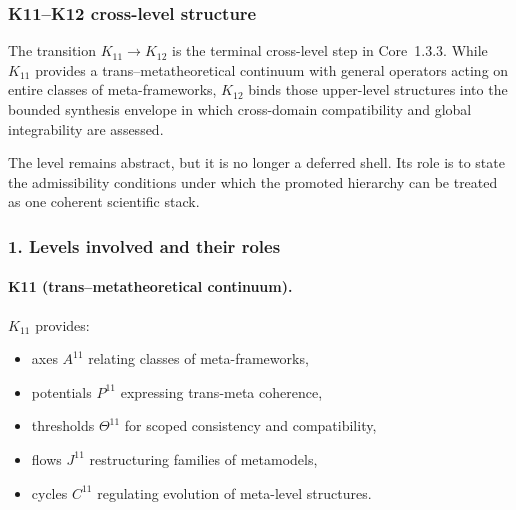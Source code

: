 
\subsubsection{K11–K12 cross-level structure}
\label{sec:crossk-k11-k12}

The transition $K_{11} \rightarrow K_{12}$ is the terminal cross-level step in
Core~1.3.3. While $K_{11}$ provides a trans–metatheoretical continuum with
general operators acting on entire classes of meta-frameworks, $K_{12}$
binds those upper-level structures into the bounded synthesis envelope in
which cross-domain compatibility and global integrability are assessed.

The level remains abstract, but it is no longer a deferred shell. Its role is to
state the admissibility conditions under which the promoted hierarchy can be
treated as one coherent scientific stack.

\subsubsection{1. Levels involved and their roles}

\paragraph{K11 (trans–metatheoretical continuum).}
$K_{11}$ provides:
\begin{itemize}
  \item axes $A^{11}$ relating classes of meta-frameworks,
  \item potentials $P^{11}$ expressing trans-meta coherence,
  \item thresholds $\Theta^{11}$ for scoped consistency and compatibility,
  \item flows $J^{11}$ restructuring families of metamodels,
  \item cycles $C^{11}$ regulating evolution of meta-level structures.
\end{itemize}

